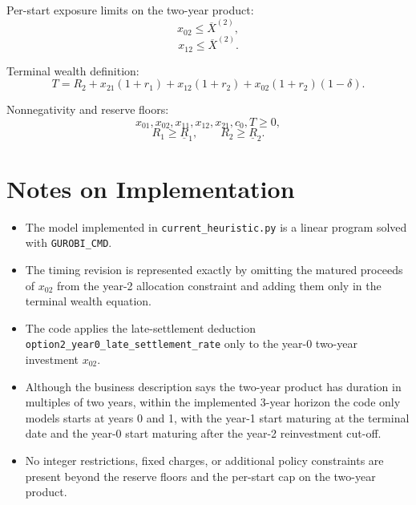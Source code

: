 Per-start exposure limits on the two-year product:
\[
x_{02} \le \overline{X}^{(2)},
\]
\[
x_{12} \le \overline{X}^{(2)}.
\]

Terminal wealth definition:
\[
T = R_2 + x_{21}(1+r_1) + x_{12}(1+r_2) + x_{02}(1+r_2)(1-\delta).
\]

Nonnegativity and reserve floors:
\[
x_{01},x_{02},x_{11},x_{12},x_{21},c_0,T \ge 0,
\]
\[
R_1 \ge \underline{R}_1,\qquad R_2 \ge \underline{R}_2.
\]

\section*{Notes on Implementation}

\begin{itemize}
    \item The model implemented in \texttt{current\_heuristic.py} is a linear program solved with \texttt{GUROBI\_CMD}.
    \item The timing revision is represented exactly by omitting the matured proceeds of $x_{02}$ from the year-2 allocation constraint and adding them only in the terminal wealth equation.
    \item The code applies the late-settlement deduction \texttt{option2\_year0\_late\_settlement\_rate} only to the year-0 two-year investment $x_{02}$.
    \item Although the business description says the two-year product has duration in multiples of two years, within the implemented 3-year horizon the code only models starts at years 0 and 1, with the year-1 start maturing at the terminal date and the year-0 start maturing after the year-2 reinvestment cut-off.
    \item No integer restrictions, fixed charges, or additional policy constraints are present beyond the reserve floors and the per-start cap on the two-year product.
\end{itemize}
